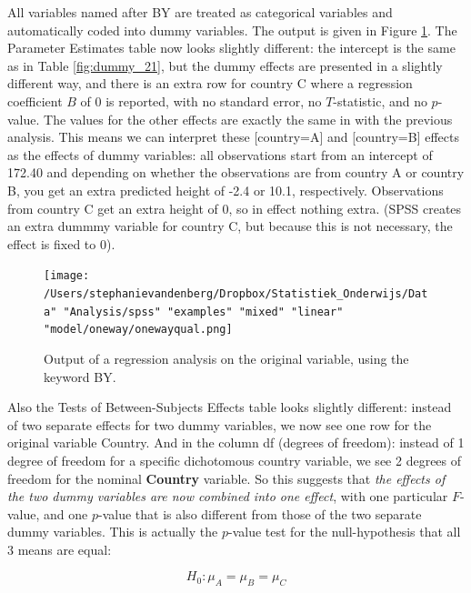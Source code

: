 \documentclass[]{book}\usepackage[]{graphicx}\usepackage[]{color}
\begin{document}
All variables named after BY are treated as categorical variables and automatically coded into dummy variables. The output is given in Figure \ref{fig:dummy_22}. The Parameter Estimates table now looks slightly different: the intercept is the same as in Table \ref{fig:dummy_21}, but the dummy effects are presented in a slightly different way, and there is an extra row for country C where a regression coefficient $B$ of 0 is reported, with no standard error, no $T$-statistic, and no $p$-value. The values for the other effects are exactly the same in with the previous analysis. This means we can interpret these [country=A] and [country=B] effects as the effects of dummy variables: all observations start from an intercept of 172.40 and depending on whether the observations are from country A or country B, you get an extra predicted height of -2.4 or 10.1, respectively. Observations from country C get an extra height of 0, so in effect nothing extra. (SPSS creates an extra dummmy variable for country C, but because this is not necessary, the effect is fixed to 0).

\begin{figure}[h]
    \begin{center}
       \texttt{[image: /Users/stephanievandenberg/Dropbox/Statistiek\_Onderwijs/Data" "Analysis/spss" "examples" "mixed" "linear" "model/oneway/onewayqual.png]}
    \end{center}
    \caption{Output of a regression analysis on the original variable, using the keyword BY.}
    \label{fig:dummy_22}
\end{figure}



Also the Tests of Between-Subjects Effects table looks slightly different: instead of two separate effects for two dummy variables, we now see one row for the original variable Country. And in the column df (degrees of freedom): instead of 1 degree of freedom for a specific dichotomous country variable, we see 2 degrees of freedom for the nominal \textbf{Country} variable. So this suggests that \textit{the effects of the two dummy variables are now combined into one effect}, with one particular $F$-value, and one $p$-value that is also different from those of the two separate dummy variables. This is actually the $p$-value test for the null-hypothesis that all 3 means are equal: 

\begin{equation}
H_0: \mu_A= \mu_B=\mu_C
\end{equation}
\end{document}
